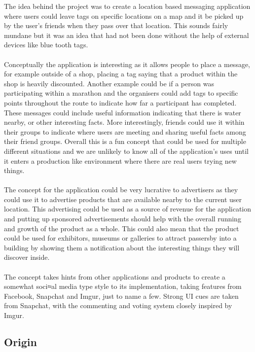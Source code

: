 The idea behind the project was to create a location based messaging application where users could leave tags on specific locations on a map and it be picked up by the user's friends when they pass over that location. This sounds fairly mundane but it was an idea that had not been done without the help of external devices like blue tooth tags.\\
\\
Conceptually the application is interesting as it allows people to place a message, for example outside of a shop, placing a tag saying that a product within the shop is heavily discounted. Another example could be if a person was participating within a marathon and the organisers could add tags to specific points throughout the route to indicate how far a participant has completed. These messages could include useful information indicating that there is water nearby, or other interesting facts. More interestingly, friends could use it within their groups to indicate where users are meeting and sharing useful facts among their friend groups. Overall this is a fun concept that could be used for multiple different situations and we are unlikely to know all of the application's uses until it enters a production like environment where there are real users trying new things.\\
\\
The concept for the application could be very lucrative to advertisers as they could use it to advertise products that are available nearby to the current user location. This advertising could be used as a source of revenue for the application and putting up sponsored advertisements should help with the overall running and growth of the product as a whole. This could also mean that the product could be used for exhibitors, museums or galleries to attract passersby into a building by showing them a notification about the interesting things they will discover inside.\\
\\
The concept takes hints from other applications and products to create a somewhat soci≈al media type style to its implementation, taking features from Facebook, Snapchat and Imgur, just to name a few. Strong UI cues are taken from Snapchat, with the commenting and voting system closely inspired by Imgur.

\subsection{Origin}

